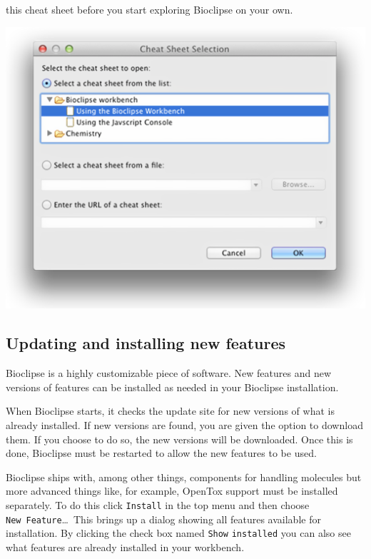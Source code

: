 \documentclass[a5paper, 10pt]{memoir}
\begin{document}
\begin{refsection}
this cheat sheet before you start exploring Bioclipse on your own.
\begin{center}
\includegraphics[width=1\textwidth]{images/cheatSheet.png}
\end{center}

\subsection{Updating and installing new features} 
Bioclipse is a highly customizable piece of software. New features and new
versions of features can be installed as needed in your Bioclipse
installation.

When Bioclipse starts, it checks the update site for new versions of what is
already installed. If new versions are found, you are given the option to
download them. If you choose to do so, the new versions will be downloaded.
Once this is done, Bioclipse must be restarted to allow the new features to be
used.

Bioclipse ships with, among other things, components for handling molecules but
more advanced things like, for example, OpenTox support must be installed
separately. To do this click \texttt{Install} in the top menu and then choose
\texttt{New}~\texttt{Feature}\ldots\ This brings up a dialog showing all
features available for installation. By clicking the check box named
\texttt{Show} \texttt{installed} you can also see what features are already
installed in your workbench.


\end{refsection}
\end{document}
